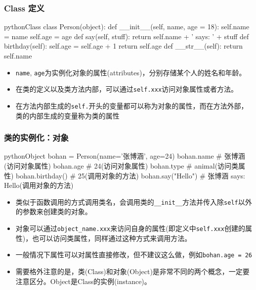 \documentclass[9pt]{beamer}
\begin{document}
\begin{frame}[fragile]
    \frametitle{Class 定义}

\begin{codebox}{python}{Class}
class Person(object):
    def __init__(self, name, age = 18):
        self.name = name
        self.age = age
    def say(self, stuff):
        return self.name + ' says: ' + stuff
    def birthday(self):
        self.age = self.age + 1
        return self.age
    def __str__(self):
        return self.name
\end{codebox}

\pause
\begin{itemize}
    \item \texttt{name}, \texttt{age}为实例化对象的属性(attributes)，分别存储某个人的姓名和年龄。
    \item 在类的定义以及类方法内部，可以通过\texttt{self.xxx}访问对象属性或者方法。
    \item 在方法内部生成的\texttt{self.}开头的变量都可以称为对象的属性，而在方法外部，类的内部生成的变量称为类的属性
\end{itemize}
    

\end{frame}


\begin{frame}[fragile]
\frametitle{类的实例化：对象}

\begin{codebox}{python}{Object}
bohan = Person(name='张博涵', age=24)
bohan.name # 张博涵(访问对象属性)
bohan.age # 24(访问对象属性)
bohan.type # animal(访问类属性)
bohan.birthday() # 25(调用对象的方法)
bohan.say("Hello") # 张博涵 says: Hello(调用对象的方法)
\end{codebox}
    
\begin{itemize}
    \item 类似于函数调用的方式调用类名，会调用类的\texttt{__init__}方法并传入除\texttt{self}以外的参数来创建类的对象。
    \item 对象可以通过\texttt{object_name.xxx}来访问自身的属性(即定义中\texttt{self.xxx}创建的属性)，也可以访问类属性，同样通过这种方式来调用方法。
    \item 一般情况下属性可以对属性直接修改，但不建议这么做，例如\texttt{bohan.age = 26}
    \item 需要格外注意的是，类(Class)和对象(Object)是非常不同的两个概念，一定要注意区分。Object是Class的实例(instance)。
\end{itemize}

\end{frame}
\end{document}

